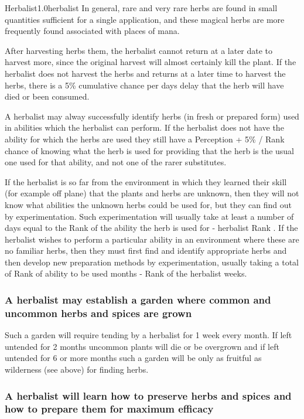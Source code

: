 \begin{skill}{Herbalist}{1.0}{herbalist}
In general, rare and very rare herbs are found in small quantities
sufficient for a single application, and these magical herbs are more
frequently found associated with places of mana.

After harvesting herbs them, the herbalist cannot return at a later
date to harvest more, since the original harvest will almost certainly
kill the plant.  If the herbalist does not harvest the herbs and
returns at a later time to harvest the herbs, there is a 5\%
cumulative chance per days delay that the herb will have died or been
consumed.

A herbalist may alway successfully identify herbs (in fresh or
prepared form) used in abilities which the herbalist can perform.  If
the herbalist does not have the ability for which the herbs are used
they still have a Perception + 5\% / Rank chance of knowing what the
herb is used for providing that the herb is the usual one used for
that ability, and not one of the rarer substitutes.

If the herbalist is so far from the environment in which they learned
their skill (for example off plane) that the plants and herbs are
unknown, then they will not know what abilities the unknown herbs
could be used for, but they can find out by experimentation.  Such
experimentation will usually take at least a number of days equal to
the Rank of the ability the herb is used for  - herbalist Rank .  If the herbalist wishes to perform a particular ability in an
environment where these are no familiar herbs, then they must first
find and identify appropriate herbs and then develop new preparation
methods by experimentation, usually taking a total of Rank of ability
to be used  months - Rank of the herbalist  weeks.

\subsubsection{A herbalist may establish a garden where common and
uncommon herbs and spices are grown}

Such a garden will require tending by a herbalist for 1 week every
month.  If left untended for 2 months uncommon plants will die or be
overgrown and if left untended for 6 or more months such a garden will
be only as fruitful as wilderness (see above) for finding herbs.

\subsubsection{A herbalist will learn how to preserve herbs and spices
and how to prepare them for maximum efficacy}


\end{skill}
